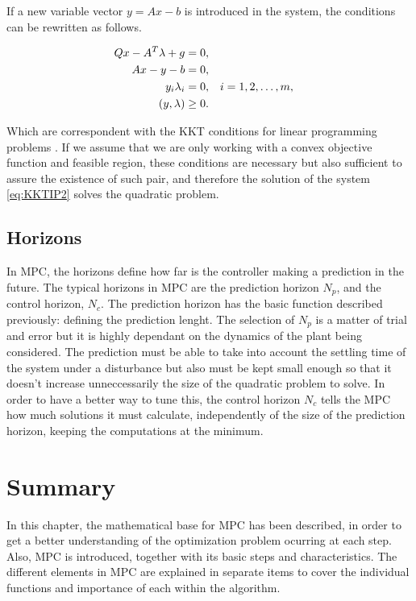 \begin{itemize}
If a new variable vector $y = Ax - b$ is introduced in the system, the conditions can be rewritten as follows.

\begin{equation} \label{eq:KKTIP2}
 \begin{subequations}
 \begin{aligned}
  Qx - A^{T}\lambda + g &= 0, \\
  Ax - y - b &= 0, \\ 
  y_{i}\lambda_{i} &= 0, && i = 1, 2, \ldots , m, \\
  (y, \lambda) &\geq 0. 
 \end{aligned}
 \end{subequations}
\end{equation}

Which are correspondent with the KKT conditions for linear programming problems \cite{Nocedal}. If we assume that we are only working with a convex objective function and feasible region, these conditions are necessary but also sufficient to assure the existence of such pair, and therefore the solution of the system \ref{eq:KKTIP2} solves the quadratic problem.

\end{itemize}

\subsection{Horizons}

In MPC, the horizons define how far is the controller making a prediction in the future. The typical horizons in MPC are the prediction horizon $N_p$, and the control horizon, $N_c$. The prediction horizon has the basic function described previously: defining the prediction lenght. The selection of $N_p$ is a matter of trial and error but it is highly dependant on the dynamics of the plant being considered. The prediction must be able to take into account the settling time of the system under a disturbance but also must be kept small enough so that it doesn't increase unneccessarily the size of the quadratic problem to solve. In order to have a better way to tune this, the control horizon $N_c$ tells the MPC how much solutions it must calculate, independently of the size of the prediction horizon, keeping the computations at the minimum.

\section{Summary}

In this chapter, the mathematical base for MPC has been described, in order to get a better understanding of the optimization problem ocurring at each step. Also, MPC is introduced, together with its basic steps and characteristics. The different elements in MPC are explained in separate items to cover the individual functions and importance of each within the algorithm.
